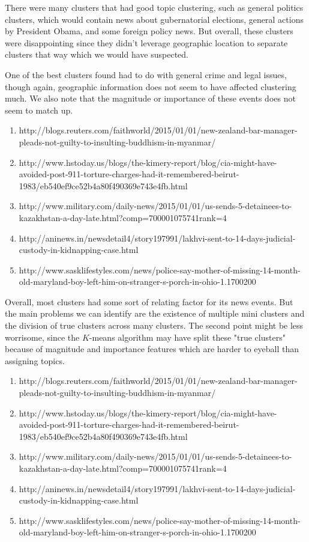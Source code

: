 \documentclass{article}
\begin{document}
	There were many clusters that had good topic clustering, such as general politics clusters, which would contain news about gubernatorial elections, general actions by President Obama, and some foreign policy news. But overall, these clusters were disappointing since they didn't leverage geographic location to separate clusters that way which we would have suspected. 

	One of the best clusters found had to do with general crime and legal issues, though again, geographic information does not seem to have affected clustering much. We also note that the magnitude or importance of these events does not seem to match up.
	\begin{enumerate}
	\item http://blogs.reuters.com/faithworld/2015/01/01/new-zealand-bar-manager-pleads-not-guilty-to-insulting-buddhism-in-myanmar/
	\item http://www.hstoday.us/blogs/the-kimery-report/blog/cia-might-have-avoided-post-911-torture-charges-had-it-remembered-beirut-1983/eb540ef9ce52b4a80f490369e743e4fb.html
	\item http://www.military.com/daily-news/2015/01/01/us-sends-5-detainees-to-kazakhstan-a-day-late.html?comp=700001075741rank=4
	\item http://aninews.in/newsdetail4/story197991/lakhvi-sent-to-14-days-judicial-custody-in-kidnapping-case.html
	\item http://www.sasklifestyles.com/news/police-say-mother-of-missing-14-month-old-maryland-boy-left-him-on-stranger-s-porch-in-ohio-1.1700200
	\end{enumerate}

	Overall, most clusters had some sort of relating factor for its news events. But the main problems we can identify are the existence of multiple mini clusters and the division of true clusters across many clusters. The second point might be less worrisome, since the $K$-means algorithm may have split these "true clusters" because of magnitude and importance features which are harder to eyeball than assigning topics.
\begin{enumerate}
\item http://blogs.reuters.com/faithworld/2015/01/01/new-zealand-bar-manager-pleads-not-guilty-to-insulting-buddhism-in-myanmar/
\item http://www.hstoday.us/blogs/the-kimery-report/blog/cia-might-have-avoided-post-911-torture-charges-had-it-remembered-beirut-1983/eb540ef9ce52b4a80f490369e743e4fb.html
\item http://www.military.com/daily-news/2015/01/01/us-sends-5-detainees-to-kazakhstan-a-day-late.html?comp=700001075741rank=4
\item http://aninews.in/newsdetail4/story197991/lakhvi-sent-to-14-days-judicial-custody-in-kidnapping-case.html
\item http://www.sasklifestyles.com/news/police-say-mother-of-missing-14-month-old-maryland-boy-left-him-on-stranger-s-porch-in-ohio-1.1700200
\end{enumerate}
\end{document}
